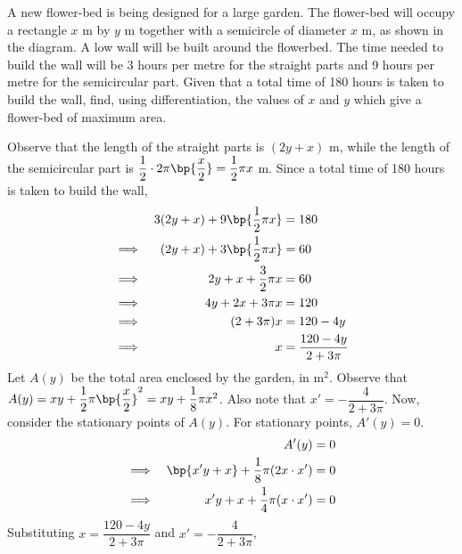 \documentclass{echw}
\begin{document}
        A new flower-bed is being designed for a large garden. The flower-bed will occupy a rectangle $x$ m by $y$ m together with a semicircle of diameter $x$ m, as shown in the diagram. A low wall will be built around the flowerbed. The time needed to build the wall will be 3 hours per metre for the straight parts and 9 hours per metre for the semicircular part. Given that a total time of 180 hours is taken to build the wall, find, using differentiation, the values of $x$ and $y$ which give a flower-bed of maximum area.

    \solution
        Observe that the length of the straight parts is $(2y + x)$ m, while the length of the semicircular part is $\dfrac12 \cdot 2\pi\bp{\dfrac{x}2} = \dfrac12 \pi x$ m. Since a total time of 180 hours is taken to build the wall,
        \begin{alignat*}{2}
            &&3 (2y + x) + 9\bp{\dfrac12 \pi x} &= 180\\
            \implies&& (2y + x) + 3\bp{\dfrac12 \pi x} &= 60\\
            \implies&&2y + x + \dfrac32 \pi x &= 60\\
            \implies&&4y + 2x + 3\pi x &= 120\\
            \implies&&(2 + 3\pi)x &= 120-4y\\
            \implies&& x &= \dfrac{120-4y}{2+3\pi}
        \end{alignat*}
        Let $A(y)$ be the total area enclosed by the garden, in m$^2$. Observe that $A(y) = xy + \dfrac12 \pi \bp{\dfrac{x}2}^2 = xy + \dfrac18 \pi x^2$. Also note that $x' = -\dfrac4{2 + 3\pi}$. Now, consider the stationary points of $A(y)$. For stationary points, $A'(y) = 0$.
        \begin{alignat*}{2}
            &&A'(y) &= 0\\
            \implies&&\bp{x' y + x} + \dfrac18 \pi (2x \cdot x') &= 0\\
            \implies&&x' y + x + \dfrac14 \pi (x \cdot x') &= 0
        \end{alignat*}
        Substituting $x = \dfrac{120-4y}{2+3\pi}$ and $x' = -\dfrac4{2 + 3\pi}$,
\end{document}
